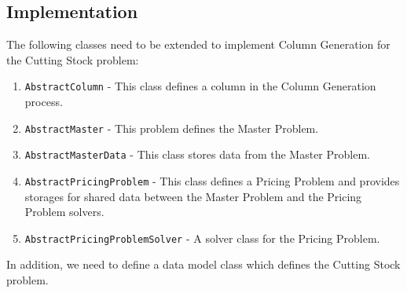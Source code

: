 \documentclass[a4paper]{article}
\newcommand{\code}[1]{\lstinline[language=java, style=seminar]!#1!}
\begin{document}
\subsection{Implementation}\label{subsec:cutting_stock_impl}
The following classes need to be extended to implement Column Generation for the Cutting Stock problem:
\begin{enumerate}[nolistsep]
 \item \code{AbstractColumn} - This class defines a column in the Column Generation process.
 \item \code{AbstractMaster} - This problem defines the Master Problem.
 \item \code{AbstractMasterData} - This class stores data from the Master Problem.
 \item \code{AbstractPricingProblem} - This class defines a Pricing Problem and provides storages for shared data between the Master Problem and the Pricing Problem solvers.
 \item \code{AbstractPricingProblemSolver} - A solver class for the Pricing Problem.
\end{enumerate}
In addition, we need to define a data model class which defines the Cutting Stock problem. \\
\end{document}
